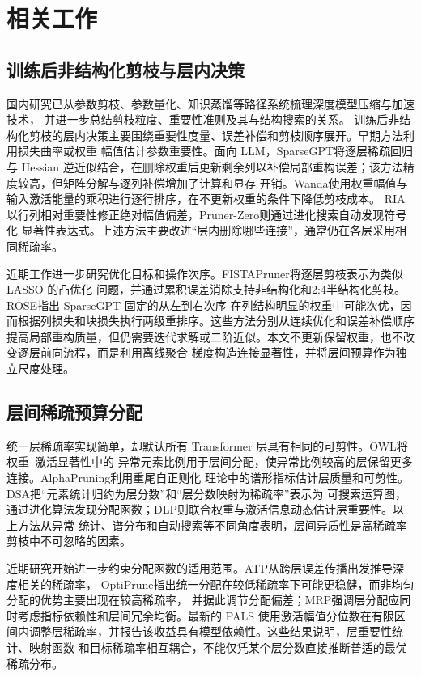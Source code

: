 \documentclass[UTF8,fontset=fandol]{ctexart}
\begin{document}
\section{相关工作}

\subsection{训练后非结构化剪枝与层内决策}

国内研究已从参数剪枝、参数量化、知识蒸馏等路径系统梳理深度模型压缩与加速技术\cite{gao2021compression}，
并进一步总结剪枝粒度、重要性准则及其与结构搜索的关系\cite{mao2023pruning}。
训练后非结构化剪枝的层内决策主要围绕重要性度量、误差补偿和剪枝顺序展开。早期方法利用损失曲率或权重
幅值估计参数重要性\cite{obd,obs,han2015}。面向 LLM，SparseGPT\cite{sparsegpt}将逐层稀疏回归与 Hessian
逆近似结合，在删除权重后更新剩余列以补偿局部重构误差；该方法精度较高，但矩阵分解与逐列补偿增加了计算和显存
开销。Wanda\cite{wanda}使用权重幅值与输入激活能量的乘积进行逐行排序，在不更新权重的条件下降低剪枝成本。
RIA\cite{ria}以行列相对重要性修正绝对幅值偏差，Pruner-Zero\cite{prunerzero}则通过进化搜索自动发现符号化
显著性表达式。上述方法主要改进“层内删除哪些连接”，通常仍在各层采用相同稀疏率。

近期工作进一步研究优化目标和操作次序。FISTAPruner\cite{fistapruner}将逐层剪枝表示为类似 LASSO 的凸优化
问题，并通过累积误差消除支持非结构化和2:4半结构化剪枝。ROSE\cite{rose}指出 SparseGPT 固定的从左到右次序
在列结构明显的权重中可能次优，因而根据列损失和块损失执行两级重排序。这些方法分别从连续优化和误差补偿顺序
提高局部重构质量，但仍需要迭代求解或二阶近似。本文不更新保留权重，也不改变逐层前向流程，而是利用离线聚合
梯度构造连接显著性，并将层间预算作为独立尺度处理。

\subsection{层间稀疏预算分配}

统一层稀疏率实现简单，却默认所有 Transformer 层具有相同的可剪性。OWL\cite{owl}将权重--激活显著性中的
异常元素比例用于层间分配，使异常比例较高的层保留更多连接。AlphaPruning\cite{alphapruning}利用重尾自正则化
理论中的谱形指标估计层质量和可剪性。DSA\cite{dsa}把“元素统计归约为层分数”和“层分数映射为稀疏率”表示为
可搜索运算图，通过进化算法发现分配函数；DLP\cite{dlp}则联合权重与激活信息动态估计层重要性。以上方法从异常
统计、谱分布和自动搜索等不同角度表明，层间异质性是高稀疏率剪枝中不可忽略的因素。

近期研究开始进一步约束分配函数的适用范围。ATP\cite{atp}从跨层误差传播出发推导深度相关的稀疏率，
OptiPrune\cite{optiprune}指出统一分配在较低稀疏率下可能更稳健，而非均匀分配的优势主要出现在较高稀疏率，
并据此调节分配偏差；MRP\cite{mrp}强调层分配应同时考虑指标依赖性和层间冗余均衡。最新的 PALS\cite{pals}
使用激活幅值分位数在有限区间内调整层稀疏率，并报告该收益具有模型依赖性。这些结果说明，层重要性统计、映射函数
和目标稀疏率相互耦合，不能仅凭某个层分数直接推断普适的最优稀疏分布。
\end{document}
